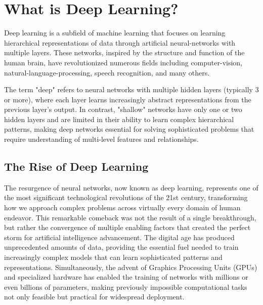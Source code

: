
\section{What is Deep Learning? }
\label{sec:what-is-dl}

Deep learning is a subfield of machine learning that focuses on learning hierarchical representations of data through artificial \gls{neural-network}s with multiple layers. These networks, inspired by the structure and function of the human brain, have revolutionized numerous fields including \gls{computer-vision}, \gls{natural-language-processing}, speech recognition, and many others.

\begin{remark}
The term "deep" refers to neural networks with multiple hidden layers (typically 3 or more), where each layer learns increasingly abstract representations from the previous layer's output. In contrast, "shallow" networks have only one or two hidden layers and are limited in their ability to learn complex hierarchical patterns, making deep networks essential for solving sophisticated problems that require understanding of multi-level features and relationships.
\end{remark}

\subsection{The Rise of Deep Learning}

The resurgence of neural networks, now known as deep learning, represents one of the most significant technological revolutions of the 21st century, transforming how we approach complex problems across virtually every domain of human endeavor. This remarkable comeback was not the result of a single breakthrough, but rather the convergence of multiple enabling factors that created the perfect storm for artificial intelligence advancement. The digital age has produced unprecedented amounts of data, providing the essential fuel needed to train increasingly complex models that can learn sophisticated patterns and representations. Simultaneously, the advent of Graphics Processing Units (GPUs) and specialized hardware has enabled the training of networks with millions or even billions of parameters, making previously impossible computational tasks not only feasible but practical for widespread deployment.

